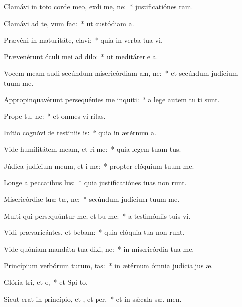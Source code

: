 \item Clamávi in toto corde meo, exdi me, ne:~* justificatiónes  ram.
\item Clamávi ad te, vum  fac:~* ut custódiam  a.
\item Prævéni in maturitáte,  clavi:~* quia in verba tua vi.
\item Prævenérunt óculi mei ad  dilo:~* ut meditárer e a.
\item Vocem meam audi secúndum misericórdiam am, ne:~* et secúndum judícium tuum  me.
\item Appropinquavérunt persequéntes me inquiti:~* a lege autem tu  ti sunt.
\item Prope  tu, ne:~* et omnes vi  ritas.
\item Inítio cognóvi de testiniis is:~* quia in ætérnum  a.
\item Vide humilitátem meam, et ri me:~* quia legem tuam   tus.
\item Júdica judícium meum, et i me:~* propter elóquium tuum  me.
\item Longe a peccaribus lus:~* quia justificatiónes tuas non runt.
\item Misericórdiæ tuæ tæ, ne:~* secúndum judícium tuum  me.
\item Multi qui persequúntur me, et bu me:~* a testimóniis tuis  vi.
\item Vidi prævaricántes, et bebam:~* quia elóquia tua non runt.
\item Vide quóniam mandáta tua dixi, ne:~* in misericórdia tua  me.
\item Princípium verbórum turum, tas:~* in ætérnum ómnia judícia jus æ.
\item Glória tri, et o,~* et Spi to.
\item Sicut erat in princípio, et , et per,~* et in sǽcula sæ. men.
